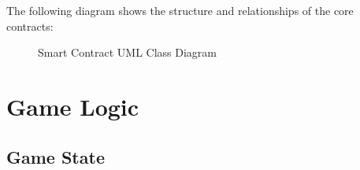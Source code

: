 \documentclass{article}
\begin{document}
    The following diagram shows the structure and relationships of the core contracts:

    \begin{figure}[H]
        \noindent{}
        \caption{Smart Contract UML Class Diagram}
        \label{fig:uml_diagram}
    \end{figure}


    \section{Game Logic}

    \subsection{Game State}
\end{document}
